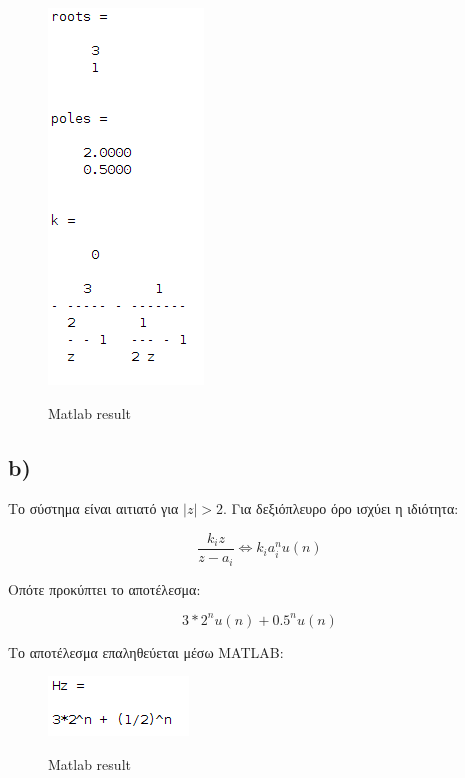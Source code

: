 \documentclass[11pt]{article}
\begin{document}
\begin{figure}[H]
    \centering
   \includegraphics[scale=0.6]{photos/roots_poles_k.png} \\
    \caption{Matlab result}
\end{figure}

\subsection*{b)}
Το σύστημα είναι αιτιατό για $|z| > 2$.
Για δεξιόπλευρο όρο ισχύει η ιδιότητα:

\[
       \frac{k_i z}{z-a_i} \Leftrightarrow k_i a_i^n u(n)
\] 

\par \noindent
Οπότε προκύπτει το αποτέλεσμα:

\[
    3 * 2^n u(n) + 0.5^n u(n)
\] 

\par \noindent
Το αποτέλεσμα επαληθεύεται μέσω MATLAB:

\begin{figure}[H]
    \centering
    \includegraphics[scale=0.7]{photos/H_z.png} \\
    \caption{Matlab result }
\end{figure}
\end{document}
